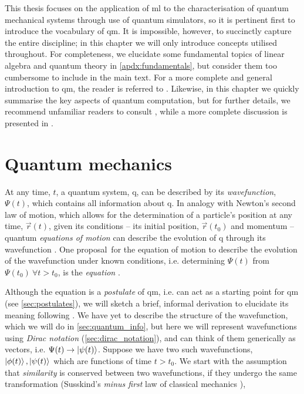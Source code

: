 This thesis focuses on the application of \acrlong{ml} to the characterisation of quantum mechanical systems
    through use of quantum simulators, 
    so it is pertinent first to introduce the vocabulary of \gls{qm}. 
It is impossible, however, to succinctly capture the entire discipline; 
    in this chapter we will only introduce concepts utilised throughout.
For completeness, we elucidate some fundamental topics of linear algebra and quantum theory in \cref{apdx:fundamentals},
    but consider them too cumbersome to include in the main text. 
For a more complete and general introduction to \gls{qm}, the reader is referred to \cite{griffiths2018introduction, susskind2014quantum}.
Likewise, in this chapter we quickly summarise the key aspects of quantum computation, 
    but for further details, we recommend unfamiliar readers to consult \cite{rieffel2011quantum}, 
    while a more complete discussion is presented in \cite{nielsen2002quantum}.

\section{Quantum mechanics}\label{sec:qm}

At any time, $t$, a quantum system, \gls{q}, can be described by its \emph{wavefunction}, $\Psi(t)$, 
    which contains all information about \gls{q}. 
In analogy with Newton's second law of motion, 
    which allows for the determination of a particle's position at any time, $\vec{r}(t)$, 
    given its conditions -- its initial position, $\vec{r}(t_0)$ and momentum --   
    quantum \emph{equations of motion} can describe the evolution of \gls{q} through its wavefunction \cite{dirac1981principles}. 
One proposal\footnotemark \ for the equation of motion 
    to describe the evolution of the wavefunction under known conditions, 
    i.e. determining $\Psi(t)$ from $\Psi(t_0) \ \forall t > t_0$, 
    is the \emph{\schrodinger equation}  \cite{griffiths2018introduction, mart2020introduce, nelson1966derivation}.
\par 

Although the \schrodinger equation is a \emph{postulate} of \gls{qm}, 
    i.e. can act as a starting point for \gls{qm} (see \cref{sec:postulates}), 
    we will sketch a brief, informal derivation to elucidate its meaning
    following \cite{susskind2014quantum}.
We have yet to describe the structure of the wavefunction, which we will do in \cref{sec:quantum_info},
    but here we will represent wavefunctions using \emph{Dirac notation} (\cref{sec:dirac_notation}), 
    and can think of them generically as vectors, i.e. $\Psi(t) \rightarrow \ket{\psi(t)}$. 
Suppose we have two such wavefunctions, $\ket{\phi(t)}, \ket{\psi(t)}$ which are functions of time $t > t_0$.
We start with the assumption that \emph{similarity} is conserved between two wavefunctions,
    if they undergo the same transformation 
    (Susskind's \emph{minus first} law of classical mechanics \cite{susskind2014quantum}),

